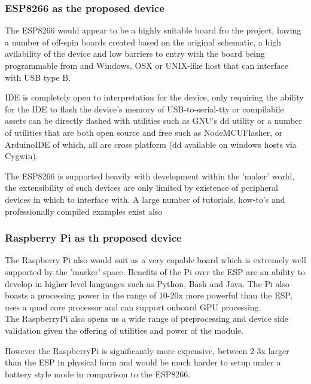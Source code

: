\documentclass{article}
\begin{document}
        \subsubsection{ESP8266 as the proposed device}
        The ESP8266\cite{ESP8266} would appear to be a highly suitable board fro the project, having
        a number of off-spin boards created based on the original schematic, a high avilability of the
        device and low barriers to entry with the board being programmable from and Windows, OSX or UNIX-like
        host that can interface with USB type B.
        \par
        IDE is completely open to interpretation for the device, only requiring the ability for the IDE to flash
        the device's memory of USB-to-serial-tty or compilabile assets can be directly flashed with utilities such
        as GNU's dd utility or a number of utilities that are both open source and free such as NodeMCUFlasher\cite{NodeMCU}, or
        ArduinoIDE\cite{ArduinoIDE} of which, all are cross platform (dd available on windows hosts via Cygwin).
        \par
        The ESP8266\cite{ESP8266} is supported heavily with development within the 'maker' world, the extensibility
        of such devices are only limited by existence of peripheral devices in which to interface with.
        A large number of tutorials, how-to's and professionally compiled examples exist also\cite{ESP8266-How-To}

        \subsubsection{Raspberry Pi as th proposed device}
        The Raspberry Pi\cite{RaspberryPi} also would suit as a very capable board which is extremely well supported 
        by the 'marker' space. Benefits of the Pi over the ESP are an ability to develop in higher level languages
        such as Python, Bash and Java. The Pi also boasts a processing power in the range of 10-20x more powerful than the 
        ESP, uses a quad core processor and can support onboard GPU processing.
        \\
        The RaspberryPi also opens us a wide range of preprocessing and device side validation given the 
        offering of utilities and power of the module. 
        \par
        However the RaspberryPi is significantly more expensive, between 2-3x larger than the ESP in physical form
        and would be much harder to setup under a battery style mode in comparison to the ESP8266.
\end{document}
